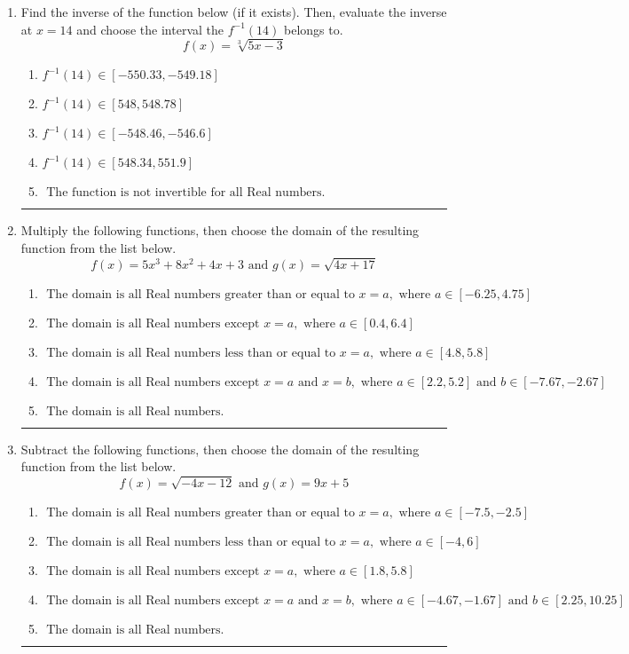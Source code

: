 \documentclass[14pt]{extbook}
\newcommand{\litem}[1]{\item#1\hspace*{-1cm}\rule{\textwidth}{0.4pt}}
\begin{document}
\begin{enumerate}
\litem{
Find the inverse of the function below (if it exists). Then, evaluate the inverse at $x = 14$ and choose the interval the $f^{-1}(14)$ belongs to.\[ f(x) = \sqrt[3]{5 x - 3} \]\begin{enumerate}[label=\Alph*.]
\item \( f^{-1}(14) \in [-550.33, -549.18] \)
\item \( f^{-1}(14) \in [548, 548.78] \)
\item \( f^{-1}(14) \in [-548.46, -546.6] \)
\item \( f^{-1}(14) \in [548.34, 551.9] \)
\item \( \text{ The function is not invertible for all Real numbers. } \)

\end{enumerate} }
\litem{
Multiply the following functions, then choose the domain of the resulting function from the list below.\[ f(x) = 5x^{3} +8 x^{2} +4 x + 3 \text{ and } g(x) = \sqrt{4x+17}  \]\begin{enumerate}[label=\Alph*.]
\item \( \text{ The domain is all Real numbers greater than or equal to } x = a, \text{ where } a \in [-6.25, 4.75] \)
\item \( \text{ The domain is all Real numbers except } x = a, \text{ where } a \in [0.4, 6.4] \)
\item \( \text{ The domain is all Real numbers less than or equal to } x = a, \text{ where } a \in [4.8, 5.8] \)
\item \( \text{ The domain is all Real numbers except } x = a \text{ and } x = b, \text{ where } a \in [2.2, 5.2] \text{ and } b \in [-7.67, -2.67] \)
\item \( \text{ The domain is all Real numbers. } \)

\end{enumerate} }
\litem{
Subtract the following functions, then choose the domain of the resulting function from the list below.\[ f(x) = \sqrt{-4x-12}  \text{ and } g(x) = 9x + 5 \]\begin{enumerate}[label=\Alph*.]
\item \( \text{ The domain is all Real numbers greater than or equal to } x = a, \text{ where } a \in [-7.5, -2.5] \)
\item \( \text{ The domain is all Real numbers less than or equal to } x = a, \text{ where } a \in [-4, 6] \)
\item \( \text{ The domain is all Real numbers except } x = a, \text{ where } a \in [1.8, 5.8] \)
\item \( \text{ The domain is all Real numbers except } x = a \text{ and } x = b, \text{ where } a \in [-4.67, -1.67] \text{ and } b \in [2.25, 10.25] \)
\item \( \text{ The domain is all Real numbers. } \)


\end{enumerate}}
\end{enumerate}
\end{document}
